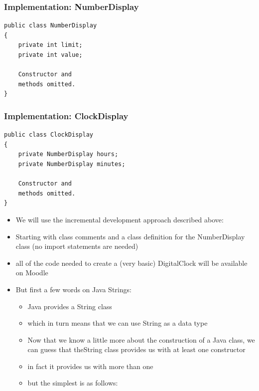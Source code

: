 \documentclass{beamer}
\begin{document}
\begin{frame}[fragile]
\frametitle{Implementation: NumberDisplay}
\begin{lstlisting}[linewidth=6cm]
public class NumberDisplay
{
    private int limit;
    private int value;

    Constructor and
    methods omitted.
}
\end{lstlisting}
\end{frame}

\begin{frame}[fragile]
\frametitle{Implementation: ClockDisplay}
\begin{lstlisting}
public class ClockDisplay
{
    private NumberDisplay hours;
    private NumberDisplay minutes;

    Constructor and
    methods omitted.
}
\end{lstlisting}
\end{frame}


\begin{frame}[fragile]

\begin{itemize}
\item We will use the incremental development approach described above:
\item Starting with class comments and a class definition for the NumberDisplay class (no import statements are needed)
\item all  of  the code needed to create a (very basic) DigitalClock will be available on Moodle
\end{itemize}
\end{frame}

\begin{frame}[fragile]
\begin{itemize}
\item But first a few words on Java Strings:
\begin{itemize}
\item Java provides a String class
\item which in turn means that we can use String as a data type
\item Now that we know a little more about the construction of a Java class, we can guess that theString class provides us with at least one constructor
\item in fact it provides us with more than one
\item but the simplest is as follows:
\end{itemize}
\end{itemize}
\end{frame}
\end{document}
